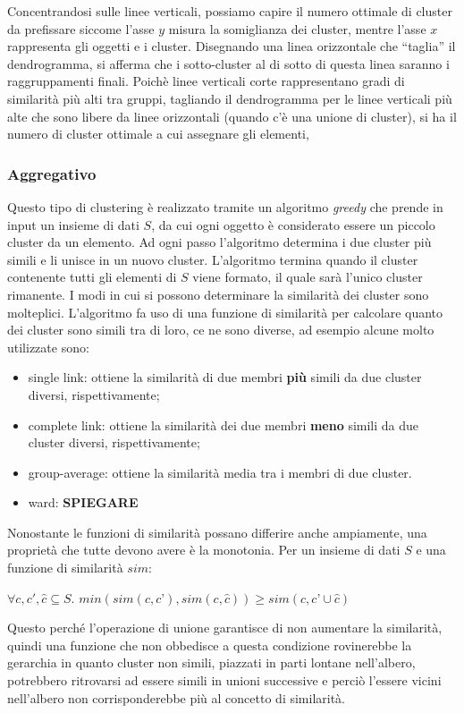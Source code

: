 \documentclass{llncs}
\begin{document}
	\clearpage
	Concentrandosi sulle linee verticali, possiamo capire il numero ottimale di cluster
	da prefissare siccome l'asse $y$ misura la somiglianza dei cluster, mentre l'asse $x$ rappresenta gli oggetti e i cluster.
	Disegnando una linea orizzontale che ``taglia'' il dendrogramma, si afferma che i sotto-cluster al di sotto di questa linea saranno i raggruppamenti finali.
	Poichè linee verticali corte rappresentano gradi di similarità più alti tra gruppi, tagliando il dendrogramma per le linee verticali più alte che sono libere da 
	linee orizzontali (quando c'è una unione di cluster), si ha il numero di cluster ottimale a cui assegnare gli elementi,

	\subsubsection{Aggregativo}
	Questo tipo di clustering è realizzato tramite un algoritmo \textit{greedy} che prende in input un insieme di dati $S$, da cui ogni oggetto è considerato essere un piccolo cluster da un elemento.
	Ad ogni passo l'algoritmo determina i due cluster più simili e li unisce in un nuovo cluster. L'algoritmo termina
	quando il cluster contenente tutti gli elementi di $S$ viene formato, il quale sarà l'unico cluster rimanente.
	I modi in cui si possono determinare la similarità dei cluster sono molteplici. L'algoritmo fa uso di una funzione di similarità per calcolare quanto dei cluster sono simili tra di loro, ce ne sono
	diverse, ad esempio alcune molto utilizzate sono:
	\begin{itemize}
		\item single link: ottiene la similarità di due membri \textbf{più} simili da due cluster diversi, rispettivamente;
		\item complete link: ottiene la similarità dei due membri \textbf{meno} simili da due cluster diversi, rispettivamente;
		\item group-average: ottiene la similarità media tra i membri di due cluster.
		\item ward: \textbf{SPIEGARE}
	\end{itemize}
	Nonostante le funzioni di similarità possano differire anche ampiamente, una proprietà che tutte devono avere è la monotonia. Per un insieme di dati $S$ e una funzione di similarità $sim$:
	\begin{center}
		$\forall c, c', \hat{c} \subseteq S$. $min(sim(c, c’), sim(c, \hat{c})) \ge sim(c, c’ \cup \hat{c})$
	\end{center}
	Questo perché l'operazione di unione garantisce	di non aumentare la similarità, quindi una funzione che non obbedisce a questa condizione
	rovinerebbe la gerarchia in quanto cluster non simili, piazzati in parti lontane nell'albero, potrebbero
	ritrovarsi ad essere simili in unioni successive e perciò l'essere vicini nell'albero non corrisponderebbe più al concetto di similarità.
\end{document}
